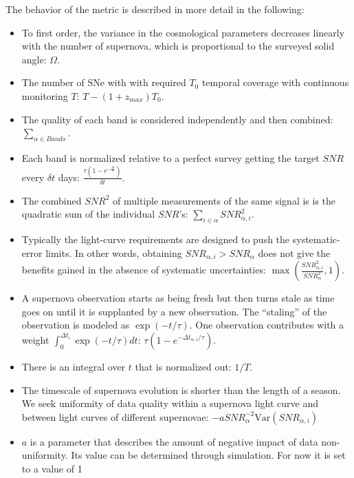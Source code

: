 \documentclass[preprint]{aastex}
\newcommand\SNR{\mathit{SNR}}
\newcommand{\Var}{\mathrm{Var}}
\begin{document}
The behavior of the metric is described in more detail in the following:
\begin{itemize}
\item To first order, the variance in the cosmological parameters decreases linearly with the number of supernova, which is proportional to the surveyed solid angle: $\Omega$.
\item The number of SNe with with required $T_0$ temporal coverage with continuous monitoring $T$: $T-(1+z_{max})T_0$.
\item The quality of each band is considered independently and then combined: $\sum_{\alpha \in Bands}$.
\item Each band is normalized relative to a perfect survey getting the target $\SNR$ every $\delta t$ days: $\frac{\tau(1-e^{-\frac{\delta t}{\tau}})}{\delta t}$.
\item The combined $\SNR^2$ of multiple measurements of the same signal is is the quadratic sum of the individual $\SNR$'s: $\sum_{i \in \alpha} \SNR_{\alpha,i}^2$.
\item Typically the light-curve requirements are designed to push the systematic-error limits.  In other words, obtaining $\SNR_{\alpha,i} > \SNR_{\alpha}$ does not give the benefits gained in the absence of  systematic uncertainties: $\max{\left(\frac{\SNR_{\alpha,i}^2}{\SNR_{\alpha}^{2} } ,1 \right)}$.
\item A supernova observation starts as being fresh but then turns stale as time goes on until it is supplanted by a new observation.  The ``staling'' of the observation
is modeled as $\exp{(-t/\tau)}$.  One observation contributes with a weight $\int_0^{\Delta t_i} \exp{(-t/\tau)}dt$: $\tau(1-e^{-\Delta t_{\alpha,i}/\tau})$.
\item There is an integral over $t$ that is normalized out: $1/T$.
\item The timescale of supernova evolution is shorter than the length of a season.  We seek uniformity of data quality within a supernova light curve and between light curves
of different supernovae: $-a\SNR_{\alpha}^{-2} \Var\left(\SNR_{\alpha,i}\right)$
\item $a$ is a parameter that describes the amount of negative impact of data non-uniformity.  Its value can be determined through simulation.  For now it is set to a value of 1
\end{itemize}
\end{document}
